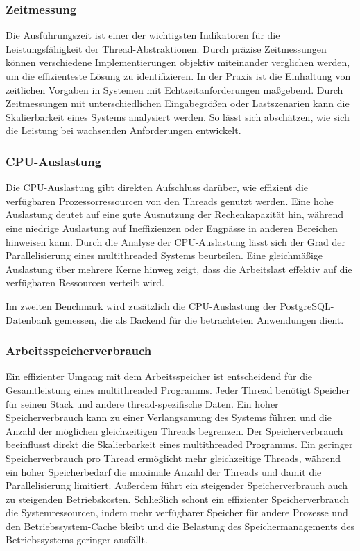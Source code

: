 \documentclass[fontsize=12pt,paper=a4,twoside=semi,parskip=half-,headsepline,headinclude]{scrreprt}
\begin{document}
\subsubsection{Zeitmessung}

Die Ausführungszeit ist einer der wichtigsten Indikatoren für die Leistungsfähigkeit der Thread-Abstraktionen. Durch präzise Zeitmessungen können verschiedene Implementierungen objektiv miteinander verglichen werden, um die effizienteste Lösung zu identifizieren. In der Praxis ist die Einhaltung von zeitlichen Vorgaben in Systemen mit Echtzeitanforderungen maßgebend. Durch Zeitmessungen mit unterschiedlichen Eingabegrößen oder Lastszenarien kann die Skalierbarkeit eines Systems analysiert werden. So lässt sich abschätzen, wie sich die Leistung bei wachsenden Anforderungen entwickelt.

\subsubsection{CPU-Auslastung}

Die CPU-Auslastung gibt direkten Aufschluss darüber, wie effizient die verfügbaren Prozessorressourcen von den Threads genutzt werden. Eine hohe Auslastung deutet auf eine gute Ausnutzung der Rechenkapazität hin, während eine niedrige Auslastung auf Ineffizienzen oder Engpässe in anderen Bereichen hinweisen kann. Durch die Analyse der CPU-Auslastung lässt sich der Grad der Parallelisierung eines multithreaded Systems beurteilen. Eine gleichmäßige Auslastung über mehrere Kerne hinweg zeigt, dass die Arbeitslast effektiv auf die verfügbaren Ressourcen verteilt wird.

Im zweiten Benchmark wird zusätzlich die CPU-Auslastung der PostgreSQL-Datenbank gemessen, die als Backend für die betrachteten Anwendungen dient.

\subsubsection{Arbeitsspeicherverbrauch}

Ein effizienter Umgang mit dem Arbeitsspeicher ist entscheidend für die Gesamtleistung eines multithreaded Programms. Jeder Thread benötigt Speicher für seinen Stack und andere thread-spezifische Daten. Ein hoher Speicherverbrauch kann zu einer Verlangsamung des Systems führen und die Anzahl der möglichen gleichzeitigen Threads begrenzen. Der Speicherverbrauch beeinflusst direkt die Skalierbarkeit eines multithreaded Programms. Ein geringer Speicherverbrauch pro Thread ermöglicht mehr gleichzeitige Threads, während ein hoher Speicherbedarf die maximale Anzahl der Threads und damit die Parallelisierung limitiert.  Außerdem führt ein steigender Speicherverbrauch auch zu steigenden Betriebskosten. Schließlich schont ein effizienter Speicherverbrauch die Systemressourcen, indem mehr verfügbarer Speicher für andere Prozesse und den Betriebssystem-Cache bleibt und die Belastung des Speichermanagements des Betriebssystems geringer ausfällt.
\end{document}
